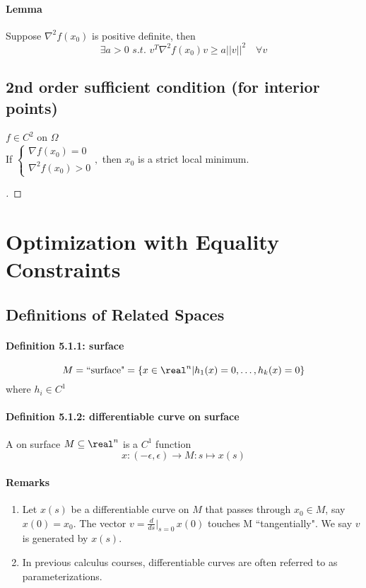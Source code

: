 \documentclass[11pt]{article}
\begin{document}
\paragraph{Lemma}
Suppose $\nabla^2 f(x_0)$ is positive definite, then
$$\exists a > 0 \,\, s.t. \,\, v^T\nabla^2f(x_0)v \geq a||v||^2 \quad \forall v$$


\subsection{2nd order sufficient condition (for interior points)}
$f \in C^2$ on $\Omega$ \\
If $\begin{cases}
	\nabla f(x_0) = 0 \\
	\nabla^2 f(x_0) > 0
\end{cases},$ then $x_0$ is a strict local minimum. \\
\begin{proof}
	[ ]
\end{proof}


\section{Optimization with Equality Constraints}

\subsection{Definitions of Related Spaces}
\paragraph{Definition 5.1.1: surface}
$$M =  \text{``surface"}  = \{ x \in \real^n | h_1(x) = 0, \hdots, h_k(x) = 0\}$$ 
where $h_i \in C^1$

\paragraph{Definition 5.1.2: differentiable curve on surface}
A  on surface $M \subseteq \real^n$ is a $C^1$ function
$$ x: (-\epsilon, \epsilon) \rightarrow M: s \mapsto x(s)$$ 
\paragraph{Remarks}
\begin{enumerate}
	\item Let $x(s)$ be a differentiable curve on $M$ that passes through $x_0 \in M$, say $x(0) = x_0$. The vector $v = \frac{d}{ds}|_{s=0} \, x(0)$ touches M ``tangentially". We say $v$ is generated by $x(s)$.
	\item In previous calculus courses, differentiable curves are often referred to as parameterizations.
\end{enumerate}
\end{document}
